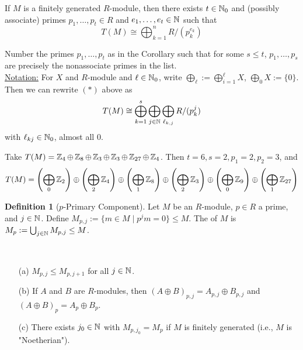 \documentclass[11pt]{book}
\theoremstyle{definition}   \newtheorem{defn}[counter]{Definition} %
\newcommand{\vs}{\vspace{8pt}}
\numberwithin{counter}{chapter}
\begin{document}
\vs

\begin{corollary}
If $M$ is a finitely generated $R$-module, then there exists $t \in \operatorname{\mathbb{N}}_0$ and (possibly associate) primes $p_1,\dots,p_t \in R$ and $e_1,\dots,e_t \in \operatorname{\mathbb{N}}$ such that
	\[T(M) \cong \bigoplus_{k=1}^n R/(p_k^{e_k}) \tag{$\ast$} \]
\end{corollary}

\vs

Number the primes $p_1,\dots,p_t$ as in the Corollary such that for some $s \leq t$, $p_1,\dots,p_s$ are precisely the nonassociate primes in the list. \\

\noindent \underline{Notation:} For $X$ and $R$-module and $\ell \in \operatorname{\mathbb{N}}_0$, write $\bigoplus_{\ell} := \bigoplus_{i=1}^\ell X$, $\bigoplus_0 X := \{0\}$. \\

Then we can rewrite $(\ast)$ above as
	\[T(M) \cong \bigoplus_{k=1}^s \bigoplus_{j \in \operatorname{\mathbb{N}}} \bigoplus_{\ell_{k,j}} R/(p_k^j) \]
with $\ell_{kj} \in \operatorname{\mathbb{N}}_0$, almost all 0.

\begin{example*}
Take $T(M) = \operatorname{\mathbb{Z}}_4 \oplus \operatorname{\mathbb{Z}}_8 \oplus \operatorname{\mathbb{Z}}_3 \oplus \operatorname{\mathbb{Z}}_3 \oplus \operatorname{\mathbb{Z}}_{27} \oplus \operatorname{\mathbb{Z}}_4$. Then $t = 6, s = 2, p_1 = 2, p_2 = 3$, and
	\[T(M) = \left(\bigoplus_0 \operatorname{\mathbb{Z}}_2\right) \oplus \left(\bigoplus_2 \operatorname{\mathbb{Z}}_4 \right) \oplus \left(\bigoplus_1 \operatorname{\mathbb{Z}}_8 \right) \oplus \left(\bigoplus_2 \operatorname{\mathbb{Z}}_3 \right) \oplus \left(\bigoplus_0 \operatorname{\mathbb{Z}}_9 \right) \oplus \left(\bigoplus_1 \operatorname{\mathbb{Z}}_{27} \right) \]
\end{example*}

\vs

\begin{defn}[$p$-Primary Component]
Let $M$ be an $R$-module, $p \in R$ a prime, and $j \in \operatorname{\mathbb{N}}$. Define $M_{p,j} := \{m \in M \mid p^j m = 0\} \leq M$. The  of $M$ is $M_p := \bigcup_{j \in \operatorname{\mathbb{N}}} M_{p,j} \leq M$.
\end{defn}

\vs

\begin{remark}\
\begin{enumerate}
\item[(a)] $M_{p,j} \leq M_{p,j+1}$ for all $j \in \operatorname{\mathbb{N}}$.
\item[(b)] If $A$ and $B$ are $R$-modules, then $(A \oplus B)_{p,j} = A_{p,j} \oplus B_{p,j}$ and $(A \oplus B)_p = A_p \oplus B_p$.

\item[(c)] There exists $j_0 \in \operatorname{\mathbb{N}}$ with $M_{p,j_0} = M_p$ if $M$ is finitely generated (i.e., $M$ is "Noetherian").
\end{enumerate}
\end{remark}
\end{document}
